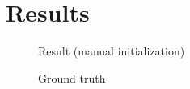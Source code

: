 \section{Results}


\begin{figure}[!htb] \centering
  \begin{minipage}{0.49\textwidth}
  \caption{Result (manual initialization)}
\end{minipage}
\begin{minipage}{0.49\textwidth} \centering
  \caption{Ground truth}
 \end{minipage}
\end{figure}

